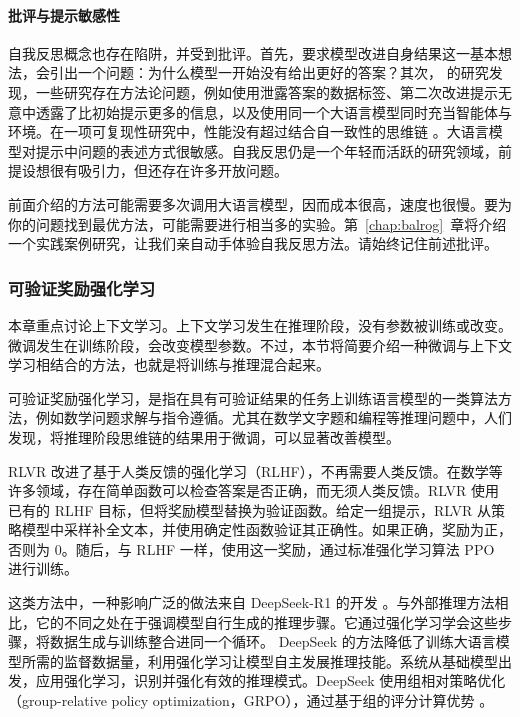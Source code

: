 \paragraph{批评与提示敏感性}
自我反思概念也存在陷阱，并受到批评。首先，要求模型改进自身结果这一基本想法，会引出一个问题：为什么模型一开始没有给出更好的答案？其次，\citet{huang2023large,shojaee2025illusion} 的研究发现，一些研究存在方法论问题，例如使用泄露答案的数据标签、第二次改进提示无意中透露了比初始提示更多的信息，以及使用同一个大语言模型同时充当智能体与环境。在一项可复现性研究中，性能没有超过结合自一致性的思维链 \citep{huang2023large}。大语言模型对提示中问题的表述方式很敏感。自我反思仍是一个年轻而活跃的研究领域，前提设想很有吸引力，但还存在许多开放问题。

前面介绍的方法可能需要多次调用大语言模型，因而成本很高，速度也很慢。要为你的问题找到最优方法，可能需要进行相当多的实验。第~\ref{chap:balrog}~章将介绍一个实践案例研究，让我们亲自动手体验自我反思方法。请始终记住前述批评。

\subsubsection{可验证奖励强化学习}\label{sec:rlvr}
本章重点讨论上下文学习。上下文学习发生在推理阶段，没有参数被训练或改变。微调发生在训练阶段，会改变模型参数。不过，本节将简要介绍一种微调与上下文学习相结合的方法，也就是将训练与推理混合起来。

可验证奖励强化学习，是指在具有可验证结果的任务上训练语言模型的一类算法方法，例如数学问题求解与指令遵循。尤其在数学文字题和编程等推理问题中，人们发现，将推理阶段思维链的结果用于微调，可以显著改善模型。

RLVR 改进了基于人类反馈的强化学习（RLHF），不再需要人类反馈。在数学等许多领域，存在简单函数可以检查答案是否正确，而无须人类反馈。RLVR 使用已有的 RLHF 目标，但将奖励模型替换为验证函数。给定一组提示，RLVR 从策略模型中采样补全文本，并使用确定性函数验证其正确性。如果正确，奖励为正，否则为 0。随后，与 RLHF 一样，使用这一奖励，通过标准强化学习算法 PPO \citep{schulman2017proximal} 进行训练。

这类方法中，一种影响广泛的做法来自 DeepSeek-R1 的开发 \cite{guo2025deepseek}。与外部推理方法相比，它的不同之处在于强调模型自行生成的推理步骤。它通过强化学习学会这些步骤，将数据生成与训练整合进同一个循环。
DeepSeek 的方法降低了训练大语言模型所需的监督数据量，利用强化学习让模型自主发展推理技能。系统从基础模型出发，应用强化学习，识别并强化有效的推理模式。DeepSeek 使用组相对策略优化（group-relative policy optimization，GRPO），通过基于组的评分计算优势 \citep{shao2024deepseekmath}。

